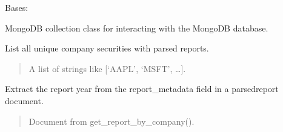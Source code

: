 \documentclass[letterpaper,10pt,english]{sphinxmanual}
\begin{document}
\begin{fulllineitems}
\label{\detokenize{src:src.db_utils.mongo.MongCollection}}
\pysigstartsignatures
{}
\pysigstopsignatures
\sphinxAtStartPar
Bases: 

\sphinxAtStartPar
MongoDB collection class for interacting with the MongoDB database.

\begin{fulllineitems}
\label{\detokenize{src:src.db_utils.mongo.MongCollection.get_available_companies}}
\pysigstartsignatures
{}
\pysigstopsignatures
\sphinxAtStartPar
List all unique company securities with parsed reports.
\begin{quote}\begin{description}
\sphinxAtStartPar
A list of strings like {[}‘AAPL’, ‘MSFT’, …{]}.

\end{description}\end{quote}

\end{fulllineitems}


\begin{fulllineitems}
\label{\detokenize{src:src.db_utils.mongo.MongCollection.get_available_years}}
\pysigstartsignatures
{}
\pysigstopsignatures
\sphinxAtStartPar
Extract the report year from the report\_metadata field in a parsed\sphinxhyphen{}report document.
\begin{quote}\begin{description}
\sphinxAtStartPar
{} \textendash{} Document from get\_report\_by\_company().


\end{description}
\end{quote}
\end{fulllineitems}
\end{fulllineitems}
\end{document}
